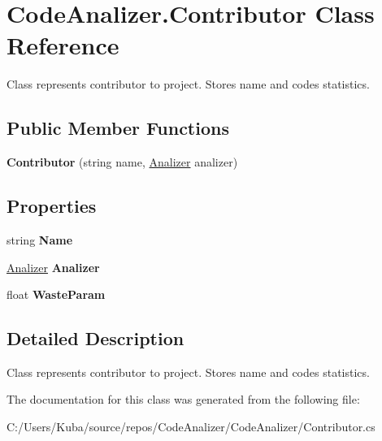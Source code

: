 \hypertarget{class_code_analizer_1_1_contributor}{}\section{Code\+Analizer.\+Contributor Class Reference}
\label{class_code_analizer_1_1_contributor}


Class represents contributor to project. Stores name and codes statistics.  


\subsection*{Public Member Functions}
\begin{DoxyCompactItemize}
\item 
\mbox{\label{class_code_analizer_1_1_contributor_a4d9c84c62b8f85b625e706b7b02cb328}} 
{\bfseries Contributor} (string name, \mbox{\hyperlink{class_code_analizer_1_1_analizer}{Analizer}} analizer)
\end{DoxyCompactItemize}
\subsection*{Properties}
\begin{DoxyCompactItemize}
\item 
\mbox{\label{class_code_analizer_1_1_contributor_a124886b6d64aae7d572ee23255389265}} 
string {\bfseries Name}
\item 
\mbox{\label{class_code_analizer_1_1_contributor_a2e9fa30e46bab8fc0164b3f45c5a47a3}} 
\mbox{\hyperlink{class_code_analizer_1_1_analizer}{Analizer}} {\bfseries Analizer}
\item 
\mbox{\label{class_code_analizer_1_1_contributor_a657e588660828118c773136c1b65df72}} 
float {\bfseries Waste\+Param}
\end{DoxyCompactItemize}


\subsection{Detailed Description}
Class represents contributor to project. Stores name and codes statistics. 



The documentation for this class was generated from the following file\+:\begin{DoxyCompactItemize}
\item 
C\+:/\+Users/\+Kuba/source/repos/\+Code\+Analizer/\+Code\+Analizer/Contributor.\+cs\end{DoxyCompactItemize}
